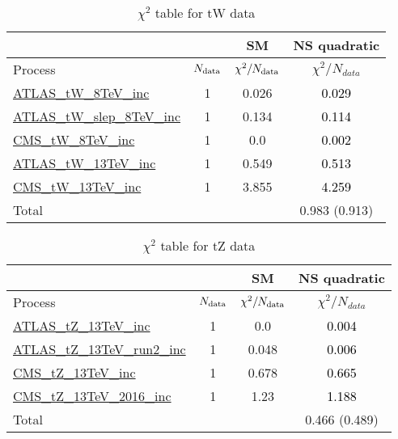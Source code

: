\documentclass{article}
\begin{document}
\begin{table}[H]
\centering
\begin{tabular}{|l|c|c|c|}
\hline
 \multicolumn{2}{|c|}{} & SM& NS quadratic\\ \hline
Process & $N_{\rm data}$ & $\chi^ 2/N_{\rm data}$& $\chi^ 2/N_{data}$\\ \hline
\href{https://arxiv.org/abs/1510.03752}{ATLAS_tW_8TeV_inc} & 1 & 0.026 & \textcolor{black}{0.029} \\ \hline
\href{https://arxiv.org/abs/2007.01554}{ATLAS_tW_slep_8TeV_inc} & 1 & 0.134 & \textcolor{black}{0.114} \\ \hline
\href{https://arxiv.org/abs/1401.2942}{CMS_tW_8TeV_inc} & 1 & 0.0 & \textcolor{black}{0.002} \\ \hline
\href{https://arxiv.org/abs/1612.07231}{ATLAS_tW_13TeV_inc} & 1 & 0.549 & \textcolor{black}{0.513} \\ \hline
\href{https://arxiv.org/abs/1805.07399}{CMS_tW_13TeV_inc} & 1 & 3.855 & \textcolor{black}{4.259} \\ \hline
\hline Total & &  & 0.983 (0.913) \\ \hline
\end{tabular}
\caption{$\chi^2$ table for tW data}
\end{table}
\begin{table}[H]
\centering
\begin{tabular}{|l|c|c|c|}
\hline
 \multicolumn{2}{|c|}{} & SM& NS quadratic\\ \hline
Process & $N_{\rm data}$ & $\chi^ 2/N_{\rm data}$& $\chi^ 2/N_{data}$\\ \hline
\href{https://arxiv.org/abs/1712.02825}{ATLAS_tZ_13TeV_inc} & 1 & 0.0 & \textcolor{black}{0.004} \\ \hline
\href{https://arxiv.org/abs/2002.07546}{ATLAS_tZ_13TeV_run2_inc} & 1 & 0.048 & \textcolor{black}{0.006} \\ \hline
\href{https://arxiv.org/abs/1712.02825}{CMS_tZ_13TeV_inc} & 1 & 0.678 & \textcolor{black}{0.665} \\ \hline
\href{https://arxiv.org/abs/1812.05900}{CMS_tZ_13TeV_2016_inc} & 1 & 1.23 & \textcolor{black}{1.188} \\ \hline
\hline Total & &  & 0.466 (0.489) \\ \hline
\end{tabular}
\caption{$\chi^2$ table for tZ data}
\end{table}
\end{document}
